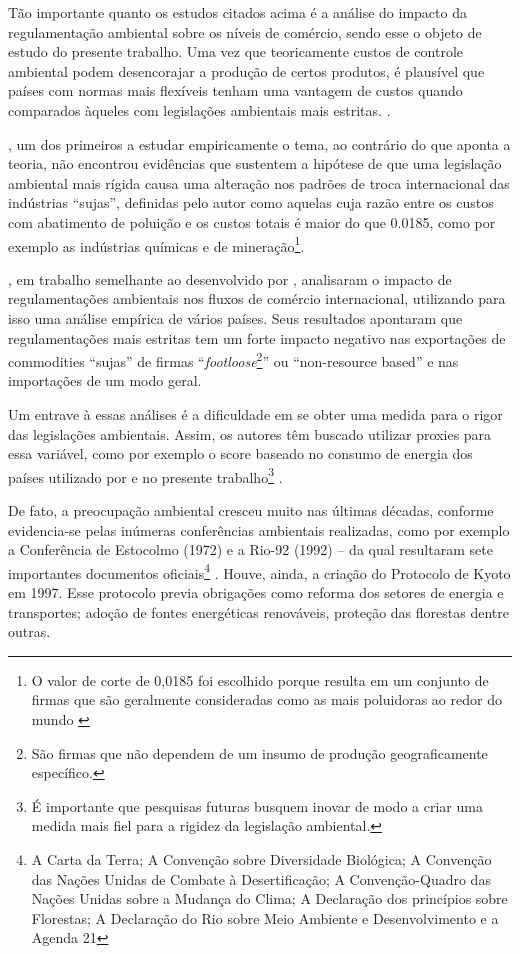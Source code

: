 \documentclass[12pt,
               openright,
               oneside,
               a4paper,
							 section=TITLE,     %
               subsection=Title,  %
               english,brazil]{article}
\begin{document}
Tão importante quanto os estudos citados acima é a análise do impacto da regulamentação ambiental sobre os níveis de comércio, sendo esse o objeto de estudo do presente trabalho. Uma vez que teoricamente custos de controle ambiental podem desencorajar a produção de certos produtos, é plausível que países com normas mais flexíveis tenham uma vantagem de custos quando comparados àqueles com legislações ambientais mais estritas. \cite{Pethig1976, Siebert1977, McGuire1982}.

, um dos primeiros a estudar empiricamente o tema, ao contrário do que aponta a teoria, não encontrou evidências que sustentem a hipótese de que uma legislação ambiental mais rígida causa uma alteração nos padrões de troca internacional das indústrias “sujas”, definidas pelo autor como aquelas cuja razão entre os custos com abatimento de poluição e os custos totais é maior do que 0.0185, como por exemplo as indústrias químicas e de mineração\footnote{O valor de corte de 0,0185 foi escolhido porque resulta em um conjunto de firmas que são geralmente consideradas como as mais poluidoras ao redor do mundo \cite{Tobey1990}}. 

, em trabalho semelhante ao desenvolvido por , analisaram o impacto de regulamentações ambientais nos fluxos de comércio internacional, utilizando para isso uma análise empírica de vários países. Seus resultados apontaram que regulamentações mais estritas tem um forte impacto negativo nas exportações de commodities “sujas” de firmas “\textit{footloose}\footnote{São firmas que não dependem de um insumo de produção geograficamente específico.}”  ou “non-resource based” e nas importações de um modo geral. 

Um entrave à essas análises é a dificuldade em se obter uma medida para o rigor das legislações ambientais. Assim, os autores têm buscado utilizar proxies para essa variável, como por exemplo o score baseado no consumo de energia dos países utilizado por  e no presente trabalho\footnote{É importante que pesquisas futuras busquem inovar de modo a criar uma medida mais fiel para a rigidez da legislação ambiental.} .

De fato, a preocupação ambiental cresceu muito nas últimas décadas, conforme evidencia-se pelas inúmeras conferências ambientais realizadas, como por exemplo a Conferência de Estocolmo (1972) e a Rio-92 (1992) – da qual resultaram sete importantes documentos oficiais\footnote{A Carta da Terra; A Convenção sobre Diversidade Biológica; A Convenção das Nações Unidas de Combate à Desertificação; A Convenção-Quadro das Nações Unidas sobre a Mudança do Clima; A Declaração dos princípios sobre Florestas; A Declaração do Rio sobre Meio Ambiente e Desenvolvimento e a Agenda 21} . Houve, ainda, a criação do Protocolo de Kyoto em 1997. Esse protocolo previa obrigações como reforma dos setores de energia e transportes; adoção de fontes energéticas renováveis, proteção das florestas dentre outras.
\end{document}
